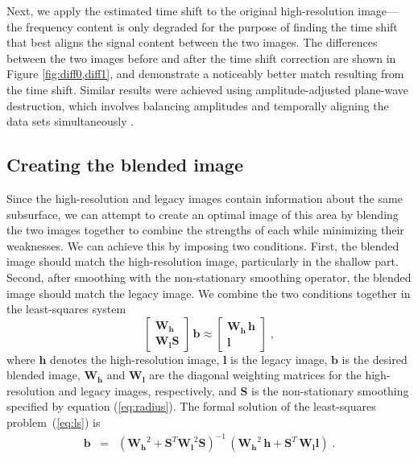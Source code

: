     Next, we apply the estimated time shift to the original high-resolution image---the frequency content is only degraded for the purpose of finding the time shift that best aligns the signal content between the two images.
    The differences between the two images before and after the time shift correction are shown in Figure \ref{fig:diff0,diff1}, and demonstrate a noticeably better match resulting from the time shift. 
    Similar results were achieved using amplitude-adjusted plane-wave destruction, which involves balancing amplitudes and temporally aligning the data sets simultaneously \cite[]{apwd}.


\subsection{Creating the blended image}
    
    Since the high-resolution and legacy images contain information about the same subsurface, we can attempt to create an optimal image of this area by blending the two images together to combine the strengths of each while minimizing their weaknesses.
    We can achieve this by imposing two conditions. 
    First, the blended image should match the high-resolution image, particularly in the shallow part. 
    Second, after smoothing with the non-stationary smoothing operator, the blended image should match the legacy image. 
    We combine the two conditions together in the least-squares system
    \begin{equation}
        \label{eq:ls}
        \left[\begin{array}{c} \mathbf{W_h} \\
                \mathbf{W_lS} \end{array}\right]\,\mathbf{b} \approx \left[\begin{array}{c} \mathbf{W_h\,h} \\
                \mathbf{l} \end{array}\right]\;,
    \end{equation}
    where $\mathbf{h}$ denotes the high-resolution image, $\mathbf{l}$ is the legacy image, $\mathbf{b}$ is the desired blended image, $\mathbf{W_h}$ and $\mathbf{W_l}$ are the diagonal weighting matrices for the high-resolution and legacy images, respectively, and $\mathbf{S}$ is the non-stationary smoothing specified by equation (\ref{eq:radius}). 
    The formal solution of the least-squares problem~(\ref{eq:ls}) is
    \begin{eqnarray}
        \mathbf{b} & = & \left(\mathbf{W_h}^2 + \mathbf{S}^T\mathbf{W_l}^2\mathbf{S}\right)^{-1}\,\left(\mathbf{W_h}^2\,\mathbf{h}+\mathbf{S}^T\,\mathbf{W_l}\mathbf{l}\right)\;.
        \label{eq:inv}
    \end{eqnarray}
    
